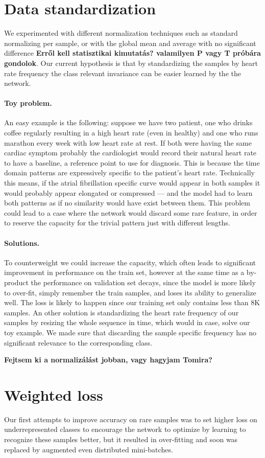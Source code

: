 \section{Data standardization}
We experimented with different normalization techniques such as standard normalizing per sample, or with the global mean and average with no significant difference \textbf{Erről kell statisztikai kimutatás? valamilyen P vagy T próbára gondolok}.
Our current hypothesis is that by standardizing the samples by heart rate frequency the class relevant invariance can be easier learned by the the network.
\paragraph{Toy problem.}
An easy example is the following: suppose we have two patient, one who drinks coffee regularly resulting in a high heart rate (even in healthy) and one who runs marathon every week with low heart rate at rest.
If both were having the same cardiac symptom probably the cardiologist would record their natural heart rate to have a baseline, a reference point to use for diagnosis.
This is because the time domain patterns are expressively specific to the patient's heart rate.
Technically this means, if the atrial fibrillation specific curve would appear in both samples it would probably appear elongated or compressed --- and the model had to learn both patterns as if no similarity would have exist between them.
This problem could lead to a case where the network would discard some rare feature, in order to reserve the capacity for the trivial pattern just with different lengths.
\cite{Figure Same pattern different frequency}
\paragraph{Solutions.}
To counterweight we could increase the capacity, which often leads to significant improvement in performance on the train set, however at the same time as a by-product the performance on validation set decays, since the model is more likely to over-fit, simply remember the train samples, and loses its ability to generalize well.
The loss is likely to happen since our training set only contains less than 8K samples.
An other solution is standardizing the heart rate frequency of our samples by resizing the whole sequence in time, which would in case, solve our toy example.
We made sure that discarding the sample specific frequency has no significant relevance to the corresponding class.
\cite{2D histogram, violin plot? attractive :)}

\textbf{Fejtsem ki a normalizálást jobban, vagy hagyjam Tomira?}

\section{Weighted loss}
Our first attempts to improve accuracy on rare samples was to set higher loss on underrepresented classes to encourage the network to optimize by learning to recognize these samples better, but it resulted in over-fitting and soon was replaced by augmented even distributed mini-batches.
